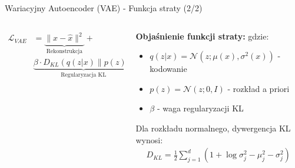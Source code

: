 \documentclass{beamer}
\begin{document}
\begin{frame}{Wariacyjny Autoencoder (VAE) - Funkcja straty (2/2)}
  \begin{columns}
    \begin{column}{0.5\textwidth}
      \begin{tcolorbox}[colback=yellow!10!white, colframe=black!60, boxrule=0.5pt, arc=3mm]
        \begin{align*}
          \mathcal{L}_{VAE} &= \underbrace{\|x - \hat{x}\|^2}_{\text{Rekonstrukcja}} + \\
          &\underbrace{\beta \cdot D_{KL}(q(z|x) \| p(z))}_{\text{Regularyzacja KL}}
        \end{align*}
      \end{tcolorbox}
    \end{column}
    \begin{column}{0.5\textwidth}
      \textbf{Objaśnienie funkcji straty:}
      \medskip
      gdzie:
      \begin{itemize}
        \item $q(z|x) = \mathcal{N}(z; \mu(x), \sigma^2(x))$ - kodowanie
        \item $p(z) = \mathcal{N}(z; 0, I)$ - rozkład a priori
        \item $\beta$ - waga regularyzacji KL
      \end{itemize}
      
      \medskip
      Dla rozkładu normalnego, dywergencja KL wynosi:
      \begin{align*}
        D_{KL} = \frac{1}{2}\sum_{j=1}^{d}(1 + \log \sigma_j^2 - \mu_j^2 - \sigma_j^2)
      \end{align*}
    \end{column}
  \end{columns}
\end{frame}
\end{document}
